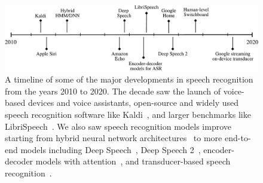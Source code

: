 \begin{figure}
\centering
\includegraphics[width=\linewidth]{figures/asr_timeline}
\caption{A timeline of some of the major developments in speech recognition
    from the years 2010 to 2020. The decade saw the launch of
    voice-based devices and voice assistants, open-source and widely used
    speech recognition software like Kaldi~\citep{povey2011kaldi}, and larger
    benchmarks like LibriSpeech~\citep{panayotov2015librispeech}. We also saw
    speech recognition models improve starting from hybrid neural network
    architectures~\citep{hinton2012deep} to more end-to-end models including
    Deep Speech~\citep{hannun2014deep}, Deep Speech 2~\citep{amodei2016deep},
    encoder-decoder models with attention~\citep{chorowski2015attention}, and
    transducer-based speech recognition~\citep{he2019streaming}.}
\label{fig:asr_timeline}
\end{figure}
